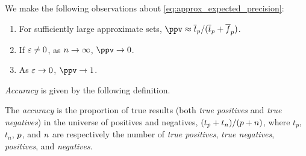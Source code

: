 \documentclass[10pt,final,hidelinks]{article}
\numberwithin{equation}{section}
\begin{document}
We make the following observations about \cref{eq:approx_expected_precision}:
\begin{enumerate}
	\item For sufficiently large approximate sets, $\ppv \approx 
	\overline{t}_\p / (\overline{t}_\p + \overline{f}_\p)$.
	\item If $\varepsilon \neq 0$, as $n \to \infty$, $\ppv \to 0$.
	\item As $\varepsilon \to 0$, $\ppv \to 1$.
\end{enumerate}

\emph{Accuracy} is given by the following definition.
\begin{definition}
	The \emph{accuracy} is the proportion of true results (both \emph{true 
		positives} and \emph{true negatives}) in the universe of positives and 
	negatives, $(t_p + t_n)/(p + n)$, where $t_p$, $t_n$, $p$, and $n$ are 
	respectively the number of \emph{true positives}, \emph{true negatives}, 
	\emph{positives}, and \emph{negatives}.
\end{definition}
\end{document}

